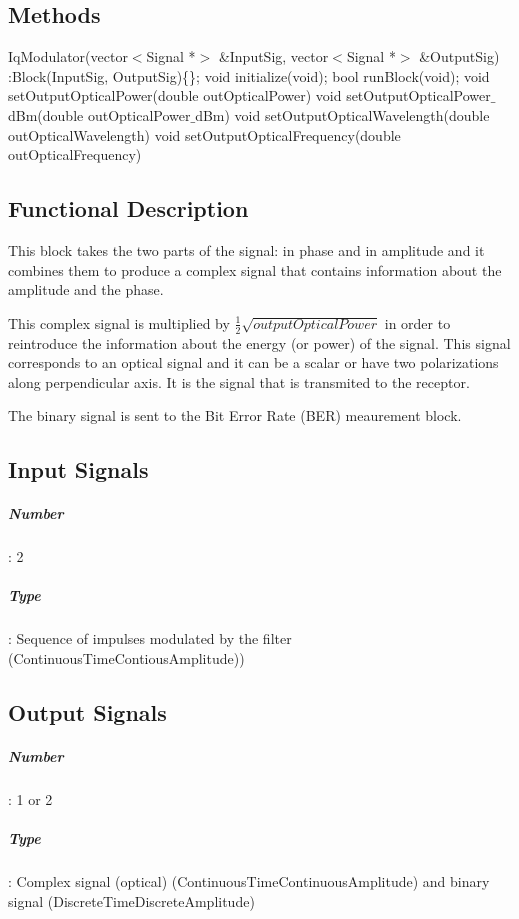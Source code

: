 \subsection*{Methods}

IqModulator(vector$<$Signal *$>$ \&InputSig, vector$<$Signal *$>$ \&OutputSig) :Block(InputSig, OutputSig)\{\};
\bigbreak
void initialize(void);
\bigbreak
bool runBlock(void);
\bigbreak
void setOutputOpticalPower(double outOpticalPower)
\bigbreak
void setOutputOpticalPower$\_$dBm(double outOpticalPower$\_$dBm)
\bigbreak
void setOutputOpticalWavelength(double outOpticalWavelength)
\bigbreak
void setOutputOpticalFrequency(double outOpticalFrequency)

\subsection*{Functional Description}

This block takes the two parts of the signal: in phase and in amplitude and it combines them to produce a complex signal that contains information about the amplitude and the phase.

This complex signal is multiplied by $\frac{1}{2}\sqrt{\textit{outputOpticalPower}}$ in order to reintroduce the information about the energy (or power) of the signal. This signal corresponds to an optical signal and it can be a scalar or have two polarizations along perpendicular axis. It is the signal that is transmited to the receptor.

The binary signal is sent to the Bit Error Rate (BER) meaurement block.

\subsection*{Input Signals}

\subparagraph*{Number}: 2

\subparagraph*{Type}: Sequence of impulses modulated by the filter (ContinuousTimeContiousAmplitude))

\subsection*{Output Signals}

\subparagraph*{Number}: 1 or 2

\subparagraph*{Type}: Complex signal (optical) (ContinuousTimeContinuousAmplitude) and binary signal (DiscreteTimeDiscreteAmplitude)

